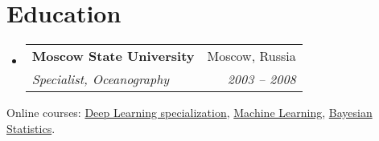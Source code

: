 \documentclass[letterpaper,11pt]{article}
\makeatletter
\newcommand{\resumeSubheading}[4]{
  \vspace{-1pt}\item
    \begin{tabular*}{0.97\textwidth}[t]{l@{\extracolsep{\fill}}r}
      \textbf{#1} & #2 \\
      \textit{\small#3} & \textit{\small #4} \\
    \end{tabular*}\vspace{-5pt}
}
\newcommand{\resumeSubHeadingListStart}{\begin{itemize}[leftmargin=*]}
\newcommand{\resumeSubHeadingListEnd}{\end{itemize}}
\makeatother
\begin{document}
\section{Education}
  \resumeSubHeadingListStart
    \resumeSubheading
      {Moscow State University}{Moscow, Russia}
      {Specialist, Oceanography}{2003 -- 2008}
  \resumeSubHeadingListEnd
  
  Online courses:
  {\href{https://coursera.org/share/738f07c3514e74b4b4a2ec4c7df53d11}{Deep Learning specialization},
   \href{https://coursera.org/share/a7e216966ca1e16fd6c58b7d58cb0806}{Machine Learning},
   \href{https://coursera.org/share/2a20ba63d42f5a2557db34e3e9837382}{Bayesian Statistics}.}



\end{document}
